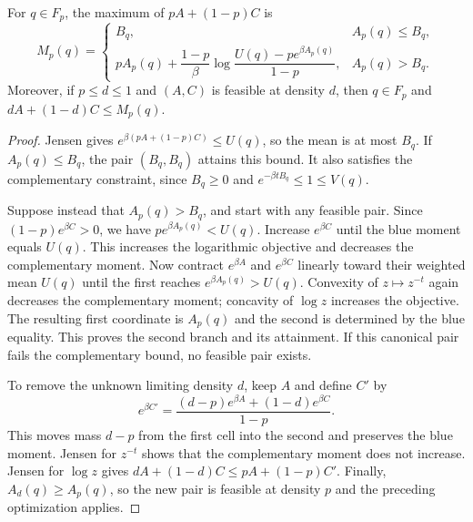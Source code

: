 \begin{lemma}\label{lem:optimizer}
For $q\in F_p$, the maximum of $pA+(1-p)C$ is
\begin{equation}\label{eq:optimizer}
 M_p(q)=
 \begin{cases}
 B_q,& A_p(q)\le B_q,\\[1mm]
 pA_p(q)+\dfrac{1-p}{\beta}
 \log\dfrac{U(q)-p e^{\beta A_p(q)}}{1-p},& A_p(q)>B_q.
 \end{cases}
\end{equation}
Moreover, if $p\le d\le1$ and $(A,C)$ is feasible at density $d$,
then $q\in F_p$ and $dA+(1-d)C\le M_p(q)$.
\end{lemma}
\begin{proof}
Jensen gives $e^{\beta(pA+(1-p)C)}\le U(q)$, so the mean is at most
$B_q$. If $A_p(q)\le B_q$, the pair $(B_q,B_q)$ attains this bound.
It also satisfies the complementary constraint, since $B_q\ge0$ and
$e^{-\beta tB_q}\le1\le V(q)$.

Suppose instead that $A_p(q)>B_q$, and start with any feasible pair.
Since $(1-p)e^{\beta C}>0$, we have $p e^{\beta A_p(q)}<U(q)$.
Increase $e^{\beta C}$ until the blue moment equals $U(q)$.
This increases the logarithmic objective and decreases the
complementary moment. Now contract $e^{\beta A}$ and $e^{\beta C}$ linearly
toward their weighted mean $U(q)$ until the first reaches
$e^{\beta A_p(q)}>U(q)$. Convexity of $z\mapsto z^{-t}$ again decreases
the complementary moment; concavity of $\log z$ increases the objective.
The resulting first coordinate is $A_p(q)$ and the second is determined by
the blue equality. This proves the second branch and its attainment.
If this canonical pair fails the complementary bound, no feasible pair exists.

To remove the unknown limiting density $d$, keep $A$ and define $C'$ by
\[
 e^{\beta C'}=\frac{(d-p)e^{\beta A}+(1-d)e^{\beta C}}{1-p}.
\]
This moves mass $d-p$ from the first cell into the second and preserves
the blue moment. Jensen for $z^{-t}$ shows that the complementary moment
does not increase. Jensen for $\log z$ gives
$dA+(1-d)C\le pA+(1-p)C'$. Finally, $A_d(q)\ge A_p(q)$, so the new pair
is feasible at density $p$ and the preceding optimization applies.
\end{proof}

